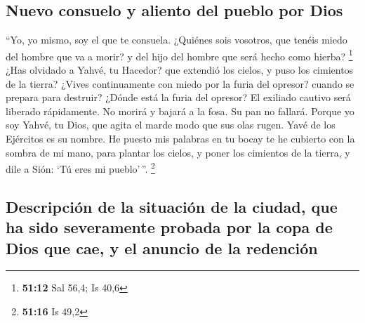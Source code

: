 \begin{paracol}{2}
\hypertarget{nuevo-consuelo-y-aliento-del-pueblo-por-dios}{%
\subsection{Nuevo consuelo y aliento del pueblo por
Dios}\label{nuevo-consuelo-y-aliento-del-pueblo-por-dios}}

 ``Yo, yo mismo, soy el que te consuela. ¿Quiénes sois
vosotros, que tenéis miedo del hombre que va a morir? y del hijo del
hombre que será hecho como hierba? \footnote{\textbf{51:12} Sal 56,4; Is
  40,6}  ¿Has olvidado a Yahvé, tu Hacedor? que extendió
los cielos, y puso los cimientos de la tierra? ¿Vives continuamente con
miedo por la furia del opresor? cuando se prepara para destruir? ¿Dónde
está la furia del opresor?  El exiliado cautivo será
liberado rápidamente. No morirá y bajará a la fosa. Su pan no fallará.
 Porque yo soy Yahvé, tu Dios, que agita el marde modo
que sus olas rugen. Yavé de los Ejércitos es su nombre. 
He puesto mis palabras en tu bocay te he cubierto con la sombra de mi
mano, para plantar los cielos, y poner los cimientos de la tierra, y
dile a Sión: `Tú eres mi pueblo'\,''. \footnote{\textbf{51:16} Is 49,2}

\hypertarget{descripciuxf3n-de-la-situaciuxf3n-de-la-ciudad-que-ha-sido-severamente-probada-por-la-copa-de-dios-que-cae-y-el-anuncio-de-la-redenciuxf3n}{%
\subsection{Descripción de la situación de la ciudad, que ha sido
severamente probada por la copa de Dios que cae, y el anuncio de la
redención}\label{descripciuxf3n-de-la-situaciuxf3n-de-la-ciudad-que-ha-sido-severamente-probada-por-la-copa-de-dios-que-cae-y-el-anuncio-de-la-redenciuxf3n}}


\end{paracol}
